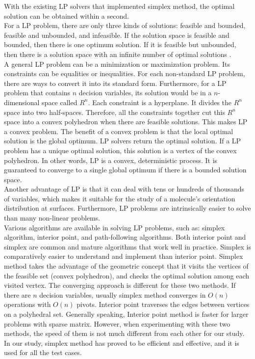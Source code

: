 With the existing LP solvers that implemented simplex method, the optimal solution can be obtained within a second. \\

For a LP problem, there are only three kinds of solutions: feasible and bounded, feasible and unbounded, and infeasible. If the solution space is feasible and bounded, then there is one optimum solution. If it is feasible but unbounded, then there is a solution space with an infinite number of optimal solutions \cite{LP}. \\

A general LP problem can be a minimization or maximization problem. Its constraints can be equalities or inequalities. For each non-standard LP problem, there are ways to convert it into its standard form. Furthermore, for a LP problem that contains $n$ decision variables, its solution would be in a $n$-dimensional space called $R^{n}$. Each constraint is a hyperplane. It divides the $R^{n}$ space into two half-spaces. Therefore, all the constraints together cut this $R^{n}$ space into a convex polyhedron when there are feasible solutions. This makes LP a convex problem. The benefit of a convex problem is that the local optimal solution is the global optimum. LP solvers return the optimal solution. If a LP problem has a unique optimal solution, this solution is a vertex of the convex polyhedron. In other words, LP is a convex, deterministic process. It is guaranteed to converge to a single global optimum if there is a bounded solution space. \\

Another advantage of LP is that it can deal with tens or hundreds of thousands of variables, which makes it suitable for the study of a molecule's orientation distribution at surfaces. Furthermore, LP problems are intrinsically easier to solve than many non-linear problems. \\

Various algorithms are available in solving LP problems, such as: simplex algorithm, interior point, and path-following algorithms. Both interior point and simplex are common and mature algorithms that work well in practice. Simplex is comparatively easier to understand and implement than interior point. Simplex method takes the advantage of the geometric concept that it visits the vertices of the feasible set (convex polyhedron), and checks the optimal solution among each visited vertex. The converging approach is different for these two methods. If there are $n$ decision variables, usually simplex method converges in $O(n)$ operations with $O(n)$ pivots. Interior point traverses the edges between vertices on a polyhedral set. Generally speaking, Interior point method is faster for larger problems with sparse matrix. However, when experimenting with these two methods, the speed of them is not much different from each other for our study. In our study, simplex method has proved to be efficient and effective, and it is used for all the test cases. \\

